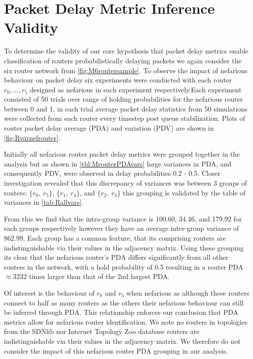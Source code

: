 \section{Packet Delay Metric Inference Validity}
\label{sec:MPDMinferencevalid}
To determine the validity of our core hypothesis that packet delay metrics enable classification of routers probabilistically delaying packets we again consider the six router network from \cref{fig:M6routersample}. To observe the impact of nefarious behaviour on packet delay six experiments were conducted with each router $r_0,\dots, r_5$ designed as nefarious in each experiment respectively.Each experiment consisted of 50 trials over range of holding probabilities for the nefarious router between 0 and 1, in each trial average packet delay statistics from 50 simulations were collected from each router every timestep post queue stabilization. Plots of router packet delay average (PDA) and variation (PDV) are shown in \cref{fig:Rvarnefrouter}.\par
Initially all nefarious router packet delay metrics were grouped together in the analysis but as shown in \cref{tbl:MrouterPDAvars} large variances in PDA, and consequently PDV, were observed in delay probabilities 0.2 - 0.5. Closer investigation revealed that this discrepancy of variances was between 3 groups of routers: $\{r_0,\ r_5\}$, $\{r_1,\ r_4\}$, and $\{r_2,\ r_3\}$ this grouping is validated by the table of variances in \cref{tab:Rallvars}.\par
From this we find that the intra-group variance is 100.60, 34.46, and 179.92 for each groups respectively however they have an average inter-group variance of 862.99. Each group has a common feature, that its comprising routers are indistinguishable via their values in the adjacency matrix. Using these grouping its clear that the nefarious router's PDA differs significantly from all other routers in the network, with a hold probability of 0.5 resulting in a router PDA $\approx$3232 times larger than that of the 2nd largest PDA.\par
Of interest is the behaviour of $r_0$ and $r_5$ when nefarious as although these routers connect to half as many routers as the others their nefarious behaviour can still be inferred through PDA. This relationship enforces our conclusion that PDA metrics allow for nefarious router identification. We note no routers in topologies from the SDNlib nor Internet Topology Zoo database routers are indistinguishable via their values in the adjacency matrix. We therefore do not consider the impact of this nefarious router PDA grouping in our analysis.\par

